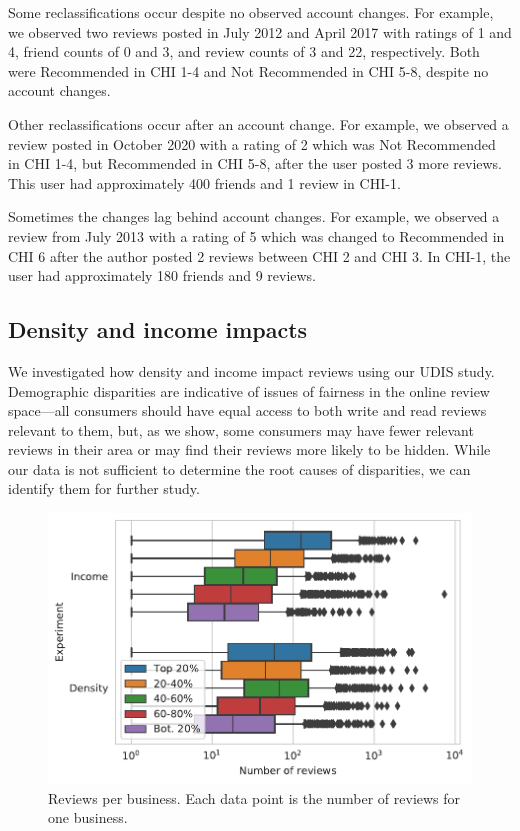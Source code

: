 Some reclassifications occur despite no observed account changes. For example, we observed two reviews posted in July 2012 and April 2017 with ratings of 1 and 4, friend counts of 0 and 3, and review counts of 3 and 22, respectively. Both were Recommended in CHI 1-4 and Not Recommended in CHI 5-8, despite no account changes.

Other reclassifications occur after an account change. For example, we observed a review posted in October 2020 with a rating of 2 which was Not Recommended in CHI 1-4, but Recommended in CHI 5-8, after the user posted 3 more reviews. This user had approximately 400 friends and 1 review in CHI-1.

Sometimes the changes lag behind account changes. For example, we observed a review from July 2013 with a rating of 5 which was changed to Recommended in CHI 6 after the author posted 2 reviews between CHI 2 and CHI 3. In CHI-1, the user had approximately 180 friends and 9 reviews.


\subsection{Density and income impacts}

We investigated how density and income impact reviews using our UDIS study. Demographic disparities are indicative of issues of fairness in the online review space---all consumers should have equal access to both write and read reviews relevant to them, but, as we show, some consumers may have fewer relevant reviews in their area or may find their reviews more likely to be hidden. While our data is not sufficient to determine the root causes of disparities, we can identify them for further study.



\begin{figure}[t]
    \centering
    \includegraphics[width=0.9\columnwidth]{chapters/reviews/figures/reviews_per_business_stratified.pdf}
    \caption[Reviews per busienss]{Reviews per business. Each data point is the number of reviews for one business. }
    \label{fig:reviews_per_business_stratified}
\end{figure}

